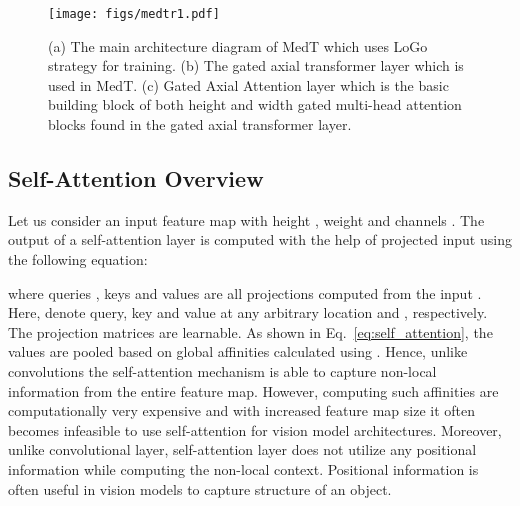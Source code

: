 \documentclass[runningheads]{llncs}
\begin{document}
	


	\begin{figure}[b!]
		\centering
		\texttt{[image: figs/medtr1.pdf]}\\
		\vskip -12.5pt
		\caption{ (a) The main architecture diagram of MedT which uses LoGo strategy for training. (b) The gated axial transformer layer which is used in MedT. (c) Gated Axial Attention layer which is the basic building block of both height and width gated multi-head attention blocks found in the gated axial transformer layer. }
		
		\label{medt}
	\end{figure}


	\subsection{Self-Attention Overview}


	Let us consider an input feature map  with height , weight  and channels . The output  of a self-attention layer is computed with the help of projected input using the following equation:
	
	where queries , keys  and values  are all projections computed from the input . Here,  denote query, key and value at any arbitrary location  and , respectively. The projection matrices  are learnable. As shown in Eq.~\ref{eq:self_attention}, the values  are pooled based on global affinities calculated using . Hence, unlike convolutions the self-attention mechanism is able to capture non-local information from the entire feature map. However, computing such affinities are computationally very expensive and with increased feature map size it often becomes infeasible to use self-attention for vision model architectures. Moreover, unlike convolutional layer, self-attention layer does not utilize any positional information while computing the non-local context. Positional information is often useful in vision models to capture structure of an object.
	
\end{document}
